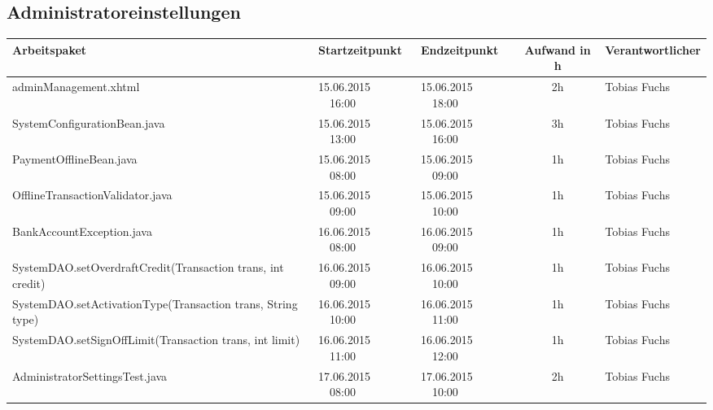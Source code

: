 \begin{landscape}
	\subsection{Administratoreinstellungen}
	\begin{tabular}{|p{10.3cm}|p{3.2cm}|p{3.2cm}|c|p{3.5cm}|}
		\hline  \textbf{Arbeitspaket} & \textbf{Startzeitpunkt} & \textbf{Endzeitpunkt} & \textbf{Aufwand in h} & \textbf{Verantwortlicher} \\ 
		\hline   adminManagement.xhtml                                 & 15.06.2015 \ \ 16:00       & 15.06.2015  \ \  18:00      &  2h                & Tobias Fuchs\\
		\hline   SystemConfigurationBean.java                          & 15.06.2015 \ \ 13:00       & 15.06.2015  \ \  16:00      &  3h                & Tobias Fuchs\\
		\hline   PaymentOfflineBean.java                               & 15.06.2015 \ \ 08:00       & 15.06.2015  \ \  09:00      &  1h                & Tobias Fuchs\\
		\hline   OfflineTransactionValidator.java                      & 15.06.2015 \ \ 09:00       & 15.06.2015  \ \  10:00      &  1h                & Tobias Fuchs\\
		\hline   BankAccountException.java                             & 16.06.2015 \ \ 08:00       & 16.06.2015  \ \  09:00      &  1h                & Tobias Fuchs\\
		\hline   SystemDAO.setOverdraftCredit(Transaction trans, int credit)  & 16.06.2015 \ \ 09:00       & 16.06.2015  \ \  10:00      &  1h                & Tobias Fuchs\\
		\hline   SystemDAO.setActivationType(Transaction trans, String type)  & 16.06.2015 \ \ 10:00       & 16.06.2015  \ \  11:00      &  1h                & Tobias Fuchs\\
		\hline   SystemDAO.setSignOffLimit(Transaction trans, int limit)      & 16.06.2015 \ \ 11:00       & 16.06.2015  \ \  12:00      &  1h                & Tobias Fuchs\\
		\hline   AdministratorSettingsTest.java     & 17.06.2015 \ \ 08:00       & 17.06.2015  \ \  10:00      &  2h                & Tobias Fuchs\\
		\hline 
	\end{tabular} \ \\
	\ \\
	

\end{landscape}
